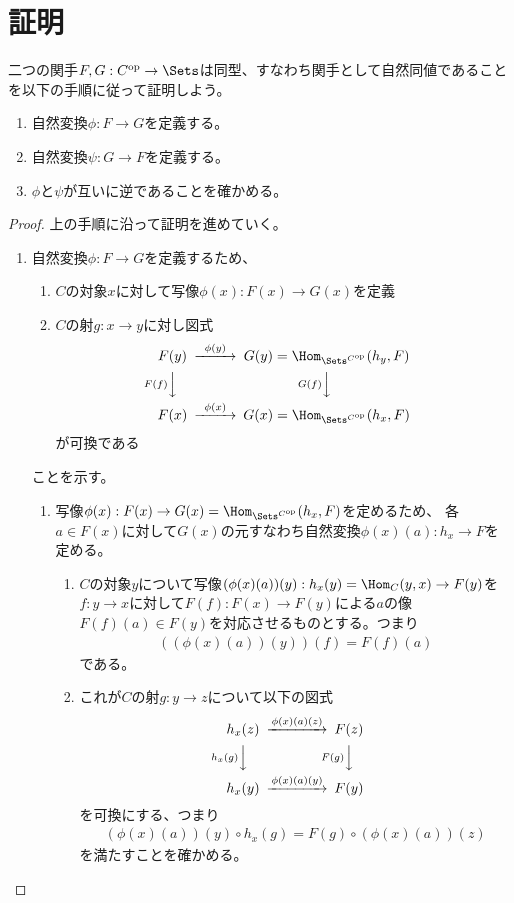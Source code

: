 \documentclass[uplatex]{jsarticle}
\begin{document}
\section{証明}

二つの関手$F,G:C^{\rm op} \to \Sets$は同型、すなわち関手として自然同値であることを以下の手順に従って証明しよう。
\begin{enumerate}
\item 自然変換$\phi:F \to G$を定義する。
\item 自然変換$\psi:G \to F$を定義する。
\item $\phi$と$\psi$が互いに逆であることを確かめる。
\end{enumerate}

\begin{proof}
上の手順に沿って証明を進めていく。
\begin{enumerate}
\item 自然変換$\phi:F\to G$を定義するため、
\begin{enumerate}
\item $C$の対象$x$に対して写像$\phi(x):F(x) \to G(x)$を定義
\item $C$の射$g:x\to y$に対し図式
\begin{align*}
\begin{CD}
F(y)@>\phi(y)>>G(y)=\Hom_{\Sets^{C^{\rm op}}}(h_y,F)\\
@VF(f)VV@VG(f)VV\\
F(x)@>\phi(x)>>G(x)=\Hom_{\Sets^{C^{\rm op}}}(h_x,F)
\end{CD}
\end{align*}
が可換である
\end{enumerate}
ことを示す。
\begin{enumerate}
\item 写像$\phi(x):F(x)\to G(x)=\Hom_{\Sets^{C^{\rm op}}}(h_x,F)$を定めるため、
各$a\in F(x)$に対して$G(x)$の元すなわち自然変換$\phi(x)(a):h_x\to F$を定める。
\begin{enumerate}
\item $C$の対象$y$について写像$(\phi(x)(a))(y):h_x(y)=\Hom_C(y,x)\to F(y)$を$f:y\to x$に対して$F(f):F(x)\to F(y)$による$a$の像$F(f)(a)\in F(y)$を対応させるものとする。つまり
\begin{align}\label{phi_def}
((\phi(x)(a))(y))(f)=F(f)(a)
\end{align}
である。
\item これが$C$の射$g:y\to z$について以下の図式
\begin{align}\label{phixa}
\begin{CD}
h_x(z)@>\phi(x)(a)(z)>>F(z)\\
@Vh_x(g)VV@VF(g)VV\\
h_x(y)@>\phi(x)(a)(y)>>F(y)
\end{CD}
\end{align}
を可換にする、つまり
\begin{align}\label{phixa_comm}
(\phi(x)(a))(y)\circ h_x(g)=F(g)\circ(\phi(x)(a))(z)
\end{align}
を満たすことを確かめる。


\end{enumerate}
\end{enumerate}
\end{enumerate}
\end{proof}
\end{document}
